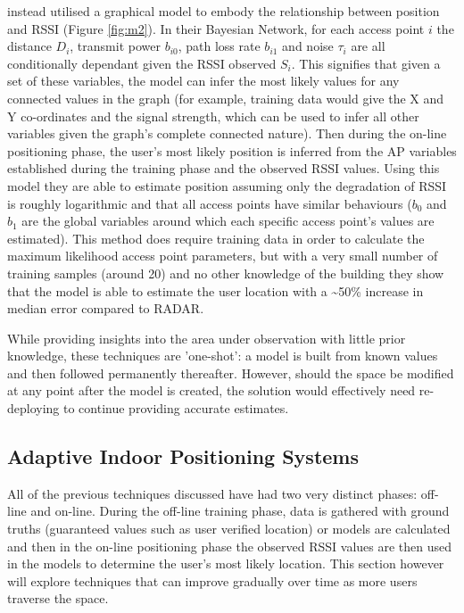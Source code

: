 \documentclass{UoYCSproject}
\begin{document}
                \citet{madigan2005bayesian} instead utilised a graphical model to embody the relationship between position and RSSI (Figure \ref{fig:m2}). In their Bayesian Network, for each access point $i$ the distance $D_i$, transmit power $b_{i0}$, path loss rate $b_{i1}$ and noise $\tau_i$ are all conditionally dependant given the RSSI observed $S_i$. This signifies that given a set of these variables, the model can infer the most likely values for any connected values in the graph (for example, training data would give the X and Y co-ordinates and the signal strength, which can be used to infer all other variables given the graph's complete connected nature). Then during the on-line positioning phase, the user's most likely position is inferred from the AP variables established during the training phase and the observed RSSI values. Using this model they are able to estimate position assuming only the degradation of RSSI is roughly logarithmic and that all access points have similar behaviours ($b_0$ and $b_1$ are the global variables around which each specific access point's values are estimated). This method does require training data in order to calculate the maximum likelihood access point parameters, but with a very small number of training samples (around 20) and no other knowledge of the building they show that the model is able to estimate the user location with a \textasciitilde50\% increase in median error compared to RADAR.
                
                While providing insights into the area under observation with little prior knowledge, these techniques are 'one-shot': a model is built from known values and then followed permanently thereafter. However, should the space be modified at any point after the model is created, the solution would effectively need re-deploying to continue providing accurate estimates.
            
            \subsection{Adaptive Indoor Positioning Systems}
            \label{sec:adaptive}
            
                All of the previous techniques discussed have had two very distinct phases: off-line and on-line. During the off-line training phase, data is gathered with ground truths (guaranteed values such as user verified location) or models are calculated and then in the on-line positioning phase the observed RSSI values are then used in the models to determine the user's most likely location. This section however will explore techniques that can improve gradually over time as more users traverse the space.
                
\end{document}

